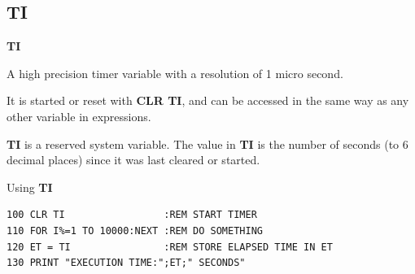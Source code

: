 \newpage
\subsection{TI}
\begin{description}[leftmargin=2cm,style=nextline]
\item [Format:] {\bf TI}
\item [Usage:]  A high precision timer variable with
                a resolution of 1 micro second.

                It is started or reset with
                {\bf CLR TI}, and can be accessed in the same way as any
                other variable in expressions.
\item [Remarks:] {\bf TI} is a reserved system variable. The value in {\bf TI}
                 is the number of seconds (to 6 decimal places) since it was last cleared or started.

\item [Example:] Using {\bf TI}
\begin{tcolorbox}[colback=black,coltext=white]
\verbatimfont{\codefont}
\begin{verbatim}
100 CLR TI                 :REM START TIMER
110 FOR I%=1 TO 10000:NEXT :REM DO SOMETHING
120 ET = TI                :REM STORE ELAPSED TIME IN ET
130 PRINT "EXECUTION TIME:";ET;" SECONDS"
\end{verbatim}
\end{tcolorbox}
\end{description}


\newpage
